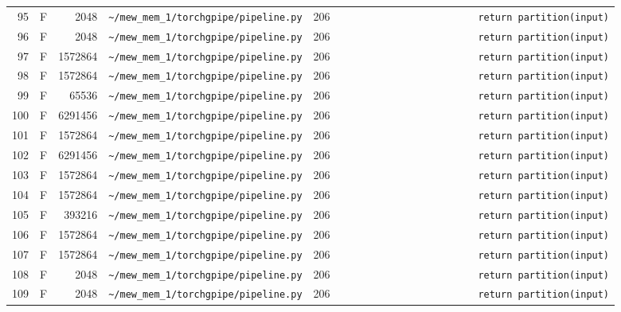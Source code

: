 \documentclass{article}
\begin{document}
\begin{longtable}{r l r p{6.5cm} r p{7.0cm}}
95 & F & 2048 & \lstinline|~/mew_mem_1/torchgpipe/pipeline.py| & 206 & \lstinline|                        return partition(input)| \\
96 & F & 2048 & \lstinline|~/mew_mem_1/torchgpipe/pipeline.py| & 206 & \lstinline|                        return partition(input)| \\
97 & F & 1572864 & \lstinline|~/mew_mem_1/torchgpipe/pipeline.py| & 206 & \lstinline|                        return partition(input)| \\
98 & F & 1572864 & \lstinline|~/mew_mem_1/torchgpipe/pipeline.py| & 206 & \lstinline|                        return partition(input)| \\
99 & F & 65536 & \lstinline|~/mew_mem_1/torchgpipe/pipeline.py| & 206 & \lstinline|                        return partition(input)| \\
100 & F & 6291456 & \lstinline|~/mew_mem_1/torchgpipe/pipeline.py| & 206 & \lstinline|                        return partition(input)| \\
101 & F & 1572864 & \lstinline|~/mew_mem_1/torchgpipe/pipeline.py| & 206 & \lstinline|                        return partition(input)| \\
102 & F & 6291456 & \lstinline|~/mew_mem_1/torchgpipe/pipeline.py| & 206 & \lstinline|                        return partition(input)| \\
103 & F & 1572864 & \lstinline|~/mew_mem_1/torchgpipe/pipeline.py| & 206 & \lstinline|                        return partition(input)| \\
104 & F & 1572864 & \lstinline|~/mew_mem_1/torchgpipe/pipeline.py| & 206 & \lstinline|                        return partition(input)| \\
105 & F & 393216 & \lstinline|~/mew_mem_1/torchgpipe/pipeline.py| & 206 & \lstinline|                        return partition(input)| \\
106 & F & 1572864 & \lstinline|~/mew_mem_1/torchgpipe/pipeline.py| & 206 & \lstinline|                        return partition(input)| \\
107 & F & 1572864 & \lstinline|~/mew_mem_1/torchgpipe/pipeline.py| & 206 & \lstinline|                        return partition(input)| \\
108 & F & 2048 & \lstinline|~/mew_mem_1/torchgpipe/pipeline.py| & 206 & \lstinline|                        return partition(input)| \\
109 & F & 2048 & \lstinline|~/mew_mem_1/torchgpipe/pipeline.py| & 206 & \lstinline|                        return partition(input)| \\

\end{longtable}
\end{document}
